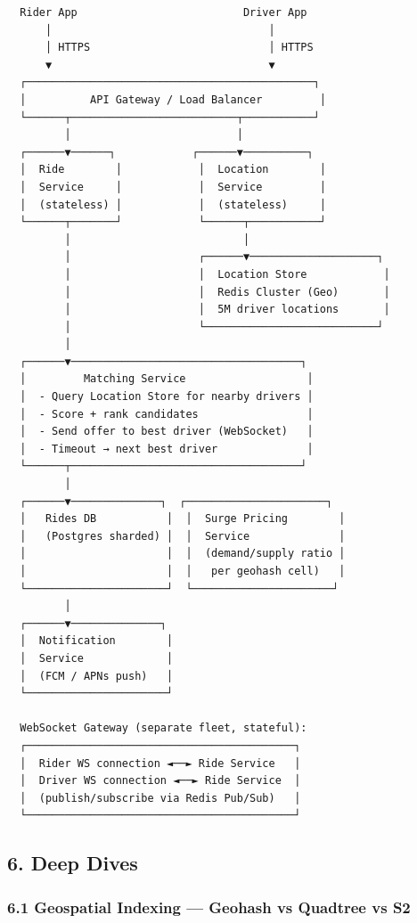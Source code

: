 \documentclass[11pt]{article}
\begin{document}
\begin{verbatim}
  Rider App                          Driver App
      │                                  │
      │ HTTPS                            │ HTTPS
      ▼                                  ▼
  ┌─────────────────────────────────────────────┐
  │          API Gateway / Load Balancer         │
  └──────┬──────────────────────────┬───────────┘
         │                          │
  ┌──────▼──────┐            ┌──────▼──────────┐
  │  Ride        │            │  Location        │
  │  Service     │            │  Service         │
  │  (stateless) │            │  (stateless)     │
  └──────┬───────┘            └──────┬───────────┘
         │                           │
         │                    ┌──────▼────────────────────┐
         │                    │  Location Store            │
         │                    │  Redis Cluster (Geo)       │
         │                    │  5M driver locations       │
         │                    └───────────────────────────┘
         │
  ┌──────▼────────────────────────────────────┐
  │         Matching Service                   │
  │  - Query Location Store for nearby drivers │
  │  - Score + rank candidates                 │
  │  - Send offer to best driver (WebSocket)   │
  │  - Timeout → next best driver              │
  └──────┬────────────────────────────────────┘
         │
  ┌──────▼──────────────┐  ┌──────────────────────┐
  │   Rides DB           │  │  Surge Pricing        │
  │   (Postgres sharded) │  │  Service              │
  │                      │  │  (demand/supply ratio │
  │                      │  │   per geohash cell)   │
  └──────────────────────┘  └──────────────────────┘
         │
  ┌──────▼──────────────┐
  │  Notification        │
  │  Service             │
  │  (FCM / APNs push)   │
  └──────────────────────┘

  WebSocket Gateway (separate fleet, stateful):
  ┌──────────────────────────────────────────┐
  │  Rider WS connection ◄──► Ride Service   │
  │  Driver WS connection ◄──► Ride Service  │
  │  (publish/subscribe via Redis Pub/Sub)   │
  └──────────────────────────────────────────┘
\end{verbatim}

\subsection{6. Deep Dives}\label{6-deep-dives-1}

\subsubsection{6.1 Geospatial Indexing --- Geohash vs Quadtree vs S2}\label{61-geospatial-indexing--geohash-vs-quadtree-vs-s2}
\end{document}
